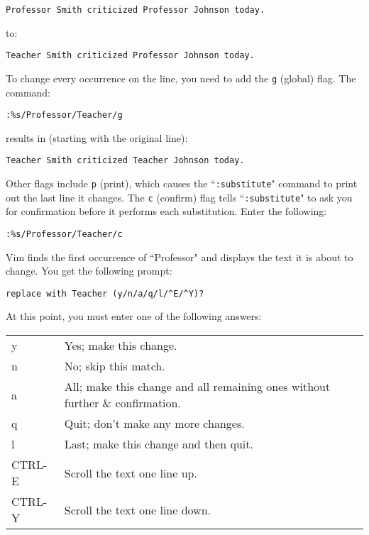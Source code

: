 \begin{Verbatim}[samepage=true]
    Professor Smith criticized Professor Johnson today.
\end{Verbatim}

to:

\begin{Verbatim}[samepage=true]
    Teacher Smith criticized Professor Johnson today.
\end{Verbatim}

To change every occurrence on the line, you need to add the \texttt{g} (global) flag.
The command:

\begin{Verbatim}[samepage=true]
 :%s/Professor/Teacher/g
\end{Verbatim}

results in (starting with the original line):

\begin{Verbatim}[samepage=true]
    Teacher Smith criticized Teacher Johnson today.
\end{Verbatim}

Other flags include \texttt{p} (print), which causes the ``\texttt{:substitute}" command to print out the last line it changes.
The \texttt{c} (confirm) flag tells ``\texttt{:substitute}" to ask you for confirmation before it performs each substitution.
Enter the following:

\begin{Verbatim}[samepage=true]
 :%s/Professor/Teacher/c
\end{Verbatim}

Vim finds the first occurrence of ``Professor" and displays the text it is about to change.
You get the following prompt:

\begin{Verbatim}[samepage=true]
 replace with Teacher (y/n/a/q/l/^E/^Y)?
\end{Verbatim}

At this point, you must enter one of the following answers:

\begin{center}\begin{tabular}{l l}
				y & Yes; make this change. \\
				n & No; skip this match. \\
				a & All; make this change and all remaining ones without further \& confirmation. \\
				q & Quit; don't make any more changes. \\
				l & Last; make this change and then quit. \\
				CTRL-E & Scroll the text one line up. \\
				CTRL-Y & Scroll the text one line down. \\
\end{tabular}\end{center}


